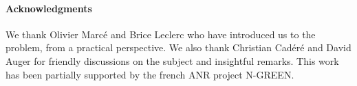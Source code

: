 \documentclass[a4paper,10pt]{journal}
\begin{document}
 	\paragraph*{Acknowledgments} 
 	We thank Olivier Marcé and Brice Leclerc who have introduced us to the problem, from a practical perspective. We also thank Christian Cad\'er\'e and David Auger for friendly discussions on the subject and insightful remarks. This work has been partially supported by the french ANR project N-GREEN.



\end{document}
